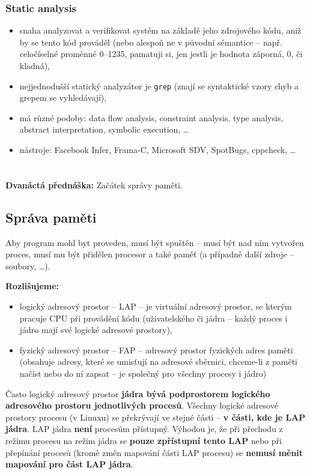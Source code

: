 \documentclass[a4paper, 11pt]{article}
\newcommand{\tcmd}[1]{\texttt{#1}}
\begin{document}
\subsubsection{Static analysis}
\begin{itemize}
 \item snaha analyzovat a verifikovat systém na základě jeho zdrojového kódu, aniž by se tento kód prováděl (nebo alespoň ne v původní sémantice -- např. celočíselné proměnné 0--1235, pamatuji si, jen jestli je hodnota záporná, 0, či kladná),
 \item nejjednodušší statický analyzátor je \tcmd{grep} (znají se syntaktické vzory chyb a grepem se vyhledávají),
 \item má různé podoby: data flow analysis, constraint analysis, type analysis, abstract interpretation, symbolic execution, \ldots
 \item nástroje: Facebook Infer, Frama-C, Microsoft SDV, SpotBugs, cppcheck, \ldots
\end{itemize}

\newpage

\section{}
\textbf{Dvanáctá přednáška:} Začátek správy paměti.
\subsection{Správa paměti}
Aby program mohl byt proveden, musí být spuštěn -- musí být nad ním vytvořen proces, musí mu být přidělen procesor a také paměť (a případně další zdroje -- soubory, \ldots).

\textbf{Rozlišujeme:}
\begin{itemize}
    \item logický adresový prostor -- LAP -- je virtuální adresový prostor, se kterým pracuje CPU při provádění kódu (uživatelského či jádra -- každý proces i jádro mají své logické adresové prostory),
    \item fyzický adresový prostor -- FAP -- adresový prostor fyzických adres paměti (obsahuje adresy, které se umisťují na adresové sběrnici, chceme-li z paměti načíst nebo do ní zapsat -- je společný pro všechny procesy i jádro)
\end{itemize}
 
Často logický adresový prostor \textbf{jádra bývá podprostorem logického adresového prostoru jednotlivých procesů}. Všechny logické adresové prostory procesu (v Linuxu) se překrývají ve stejné části -- \textbf{v části, kde je LAP jádra}. LAP jádra \textbf{není} procesům přístupný. Výhodou je, že při přechodu z režimu procesu na režim jádra se \textbf{pouze zpřístupní tento LAP} nebo při přepínání procesů (kromě změn mapování části LAP procesu) se \textbf{nemusí měnit mapování pro část LAP jádra}.
 
\end{document}
